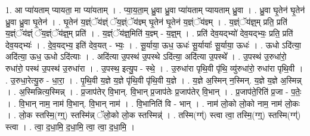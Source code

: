\documentclass[17pt]{extarticle}
\begin{document}
1. आ प्या॑यताम् प्यायता॒ मा प्या॑यताम् । . प्या॒य॒ता॒म् ध्रु॒वा ध्रु॒वा प्या॑यताम् प्यायताम् ध्रु॒वा । . ध्रु॒वा घृ॒तेन॑ घृ॒तेन॑ ध्रु॒वा ध्रु॒वा घृ॒तेन॑ । . घृ॒तेन॑ य॒ज्ञ्ंॅय॑ज्ञ्ं ॅय॒ज्ञ्ंॅय॑ज्ञ्म् घृ॒तेन॑ घृ॒तेन॑ य॒ज्ञ्ंॅय॑ज्ञ्म् । . य॒ज्ञ्ंॅय॑ज्ञ्॒म् प्रति॒ प्रति॑ य॒ज्ञ्ंॅय॑ज्ञ्ं ॅय॒ज्ञ्ंॅय॑ज्ञ्॒म् प्रति॑ । . य॒ज्ञ्ंॅय॑ज्ञ्॒मिति॑ य॒ज्ञ्म् - य॒ज्ञ्॒म् । . प्रति॑ देव॒यद्भ्यो॑ देव॒यद्भ्यः॒ प्रति॒ प्रति॑ देव॒यद्भ्यः॑ । . दे॒व॒यद्भ्य॒ इति॑ देव॒यत् - भ्यः॒ । . सू॒र्याया॒ ऊध॒ ऊधः॑ सू॒र्यायाः᳚ सू॒र्याया॒ ऊधः॑ । . ऊधो ऽदि॑त्या॒ अदि॑त्या॒ ऊध॒ ऊधो ऽदि॑त्याः । . अदि॑त्या उ॒पस्थ॑ उ॒पस्थे ऽदि॑त्या॒ अदि॑त्या उ॒पस्थे᳚ । . उ॒पस्थ॑ उ॒रुधा॑रो॒ रुधा॑रो॒ पस्थ॑ उ॒पस्थ॑ उ॒रुधा॑रा । . उ॒पस्थ॒ इत्यु॒प - स्थे॒ । . उ॒रुधा॑रा पृथि॒वी पृ॑थि॒ व्यु॑रुधा॑रो॒ रुधा॑रा पृथि॒वी । . उ॒रुधा॒रेत्यु॒रु - धा॒रा॒ । . पृ॒थि॒वी य॒ज्ञे य॒ज्ञे पृ॑थि॒वी पृ॑थि॒वी य॒ज्ञे । . य॒ज्ञे अ॒स्मिन् न॒स्मिन्. य॒ज्ञे य॒ज्ञे अ॒स्मिन्न् । . अ॒स्मिन्नित्य॒स्मिन्न् । . प्र॒जाप॑तेर् वि॒भान्. वि॒भान् प्र॒जाप॑तेः प्र॒जाप॑तेर् वि॒भान् । . प्र॒जाप॑ते॒रिति॑ प्र॒जा - प॒तेः॒ । . वि॒भान् नाम॒ नाम॑ वि॒भान्. वि॒भान् नाम॑ । . वि॒भानिति॑ वि - भान् । . नाम॑ लो॒को लो॒को नाम॒ नाम॑ लो॒कः । . लो॒क स्तस्मि॒(ग्ग्॒) स्तस्मि॑न्न् ॅलो॒को लो॒क स्तस्मिन्न्॑ । . तस्मि(ग्ग्॑) स्त्वा त्वा॒ तस्मि॒(ग्ग्॒) स्तस्मि(ग्ग्॑) स्त्वा । . त्वा॒ द॒धा॒मि॒ द॒धा॒मि॒ त्वा॒ त्वा॒ द॒धा॒मि॒ । \newline
\end{document}
